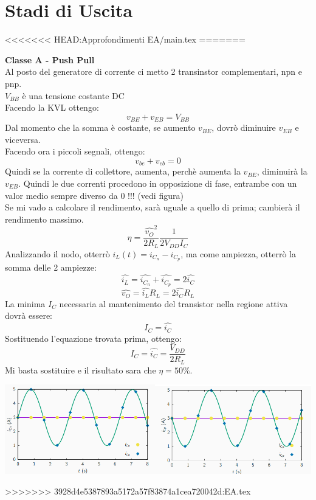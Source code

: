 \documentclass{article}
\begin{document}
\newpage
\section{Stadi di Uscita}
<<<<<<< HEAD:Approfondimenti EA/main.tex
=======

\textbf{Classe A - Push Pull}\\
Al posto del generatore di corrente ci metto 2 transinstor complementari, npn e pnp.\\
$V_{BB}$ è una tensione costante DC \\
Facendo la KVL ottengo:\\
\begin{equation}
    v_{BE}+v_{EB}=V_{BB}
\end{equation}
Dal momento che la somma è costante, se aumento $v_{BE}$, dovrò diminuire $v_{EB}$ e viceversa.\\
Facendo ora i piccoli segnali, ottengo: \\
\begin{equation}
    v_{be}+v_{eb}=0
\end{equation}
Quindi se la corrente di collettore, aumenta, perchè aumenta la $v_{BE}$, diminuirà la $v_{EB}$. Quindi le due correnti procedono in opposizione di fase, entrambe con un valor medio sempre diverso da 0 !!! (vedi figura)\\
Se mi vado a calcolare il rendimento, sarà uguale a quello di prima; cambierà il rendimento massimo.\\
\begin{equation}
    \eta=\frac{\hat{v_{O}}^2}{2R_{L}}\frac{1}{2V_{DD}I_{C}}
\end{equation}
Analizzando il nodo, otterrò $i_{L}(t)=i_{C_{n}}-i_{C_{p}}$, ma come ampiezza, otterrò la somma delle 2 ampiezze: 
\begin{equation}
    \hat{i_{L}}=\hat{i_{C_{n}}}+\hat{i_{C_{p}}}=2\hat{i_{C}}
\end{equation}
\begin{equation}
    \hat{v_{O}}=\hat{i_{L}}R_{L}=2\hat{i_{C}}R_{L}
\end{equation}
La minima $I_{C}$ necessaria al mantenimento del transistor nella regione attiva dovrà essere:
\begin{equation}
    I_{C}=\hat{i_{C}}
\end{equation}
Sostituendo l'equazione trovata prima, ottengo:
\begin{equation}
    I_{C}=\hat{i_{C}}=\frac{V_{DD}}{2R_{L}}
\end{equation}
Mi basta sostituire e il risultato sara che $ \eta=50\% $.
\begin{center}
    \includegraphics[scale=0.6]{Exit.png}
\end{center}
>>>>>>> 3928d4e5387893a5172a57f83874a1cea720042d:EA.tex
\end{document}
